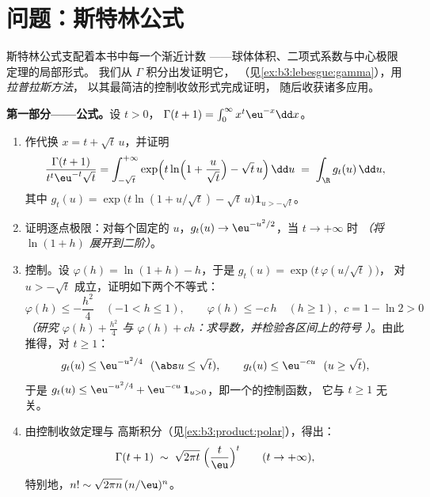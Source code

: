 \section{问题：斯特林公式}

\begin{problem}
\label{pb:b3:product:1}
斯特林公式支配着本书中每一个渐近计数
——球体体积、二项式系数与中心极限定理的局部形式。
我们从 $\Gamma$ 积分出发证明它，
（见\cref{ex:b3:lebesgue:gamma}），用\emph{拉普拉斯方法}，
以其最简洁的控制收敛形式完成证明，
随后收获诸多应用。

\medskip
\noindent\textbf{第一部分——公式。}设 $t > 0$，
$\Gamma(t + 1) = \int_0^\infty x^{t}\eu^{-x}\dd x$。
\begin{enumerate}
  \item 作代换 $x = t + \sqrt t\,u$，并证明
        \[
        \frac{\Gamma(t+1)}{t^{t}\eu^{-t}\sqrt t}
        = \int_{-\sqrt t}^{+\infty}
        \exp\Bigl(t\ln\Bigl(1 + \frac u{\sqrt
        t}\Bigr) - \sqrt t\,u\Bigr)\,\dd u
        \;=\;\int_\R g_t(u)\,\dd u,
        \]
        其中 $g_t(u) = \exp\bigl(t\ln(1 + u/\sqrt t) -
        \sqrt t\,u\bigr)\mathbf 1_{u > -\sqrt t}$。
  \item 证明逐点极限：对每个固定的 $u$，$g_t(u)
        \to \eu^{-u^2/2}$，当 $t \to +\infty$ 时 \emph{（将
        $\ln(1 + h)$ 展开到二阶）}。
  \item 控制。设 $\varphi(h) = \ln(1 + h) - h$，于是
        $g_t(u) = \exp\bigl(t\,\varphi(u/\sqrt t)\bigr)$，
        对 $u > -\sqrt t$ 成立，证明如下两个不等式：
        \[
        \varphi(h) \leq -\frac{h^2}4 \quad (-1 < h \leq 1),
        \qquad
        \varphi(h) \leq -c\,h \quad (h \geq 1),\ \ c = 1 -
        \ln 2 > 0
        \]
        \emph{（研究 $\varphi(h) + \frac{h^2}4$ 与 $\varphi(h)
        + ch$：求导数，并检验各区间上的符号
        ）}。由此推得，对 $t \geq 1$：
        \[
        g_t(u) \leq \eu^{-u^2/4}\ \ (\abs u \leq \sqrt t),
        \qquad
        g_t(u) \leq \eu^{-cu}\ \ (u \geq \sqrt t),
        \]
        于是 $g_t(u) \leq \eu^{-u^2/4} +
        \eu^{-cu}\,\mathbf 1_{u > 0}$，即一个的控制函数，
        它与 $t \geq 1$ 无关。
  \item 由控制收敛定理与
        高斯积分（见\cref{ex:b3:product:polar}），得出：
        \[
        \Gamma(t + 1) \;\sim\;
        \sqrt{2\pi t}\;\Bigl(\frac t\eu\Bigr)^{t}
        \qquad (t \to +\infty),
        \]
        特别地，$n! \sim \sqrt{2\pi
        n}\,(n/\eu)^n$。
\end{enumerate}


\end{problem}
